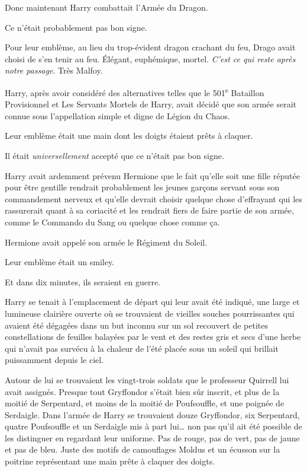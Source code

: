 Donc maintenant Harry combattait l'Armée du Dragon.

Ce n'était probablement pas bon signe.

Pour leur emblème, au lieu du trop-évident dragon crachant du feu, Drago avait choisi de s'en tenir au feu. Élégant, euphémique, mortel. \emph{C'est ce qui reste après notre passage}. Très Malfoy.

Harry, après avoir considéré des alternatives telles que le 501\textsuperscript{e} Bataillon Provisionnel et Les Servants Mortels de Harry, avait décidé que son armée serait connue sous l'appellation simple et digne de Légion du Chaos.

Leur emblème était une main dont les doigts étaient prêts à claquer.

Il était \emph{universellement} accepté que ce n'était pas bon signe.

Harry avait ardemment prévenu Hermione que le fait qu'elle soit une fille réputée pour être gentille rendrait probablement les jeunes garçons servant sous son commandement nerveux et qu'elle devrait choisir quelque chose d'effrayant qui les rassurerait quant à sa coriacité et les rendrait fiers de faire partie de son armée, comme le Commando du Sang ou quelque chose comme ça.

Hermione avait appelé son armée le Régiment du Soleil.

Leur emblème était un smiley.

Et dans dix minutes, ils seraient en guerre.

Harry se tenait à l'emplacement de départ qui leur avait été indiqué, une large et lumineuse clairière ouverte où se trouvaient de vieilles souches pourrissantes qui avaient été dégagées dans un but inconnu sur un sol recouvert de petites constellations de feuilles balayées par le vent et des restes gris et secs d'une herbe qui n'avait pas survécu à la chaleur de l'été placée sous un soleil qui brillait puissamment depuis le ciel.

Autour de lui se trouvaient les vingt-trois soldats que le professeur Quirrell lui avait assignés. Presque tout Gryffondor s'était bien sûr inscrit, et plus de la moitié de Serpentard, et moins de la moitié de Poufsouffle, et une poignée de Serdaigle. Dans l'armée de Harry se trouvaient douze Gryffondor, six Serpentard, quatre Poufsouffle et un Serdaigle mis à part lui… non pas qu'il ait été possible de les distinguer en regardant leur uniforme. Pas de rouge, pas de vert, pas de jaune et pas de bleu. Juste des motifs de camouflages Moldus et un écusson sur la poitrine représentant une main prête à claquer des doigts.

